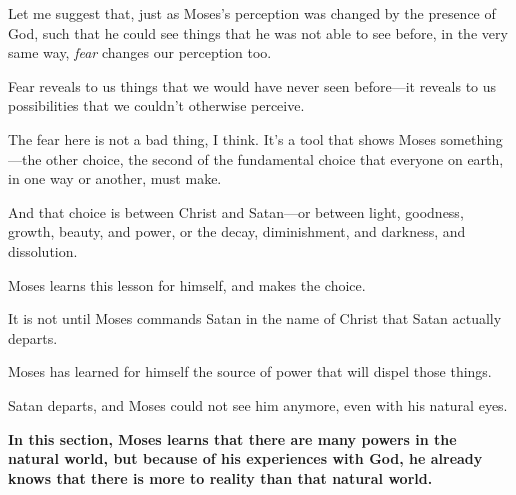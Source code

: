 \begin{compactitem}
\begin{compactitem}
\begin{compactitem}
							\item Let me suggest that, just as Moses's perception was changed by the presence of God, such that he could see things that he was not able to see before, in the very same way, \textit{fear} changes our perception too.
							\item Fear reveals to us things that we would have never seen before---it reveals to us possibilities that we couldn't otherwise perceive.
							\item The fear here is not a bad thing, I think. It's a tool that shows Moses something---the other choice, the second of the fundamental choice that everyone on earth, in one way or another, must make.
							\item And that choice is between Christ and Satan---or between light, goodness, growth, beauty, and power, or the decay, diminishment, and darkness, and dissolution.
						\end{compactitem}
					\item Moses learns this lesson for himself, and makes the choice. 
						\begin{compactitem}
							\item It is not until Moses commands Satan in the name of Christ that Satan actually departs.
							\item Moses has learned for himself the source of power that will dispel those things.
							\item Satan departs, and Moses could not see him anymore, even with his natural eyes.
						\end{compactitem} 
					\item \textbf{In this section, Moses learns that there are many powers in the natural world, but because of his experiences with God, he already knows that there is more to reality than that natural world.}
				\end{compactitem}
				

\end{compactitem}
